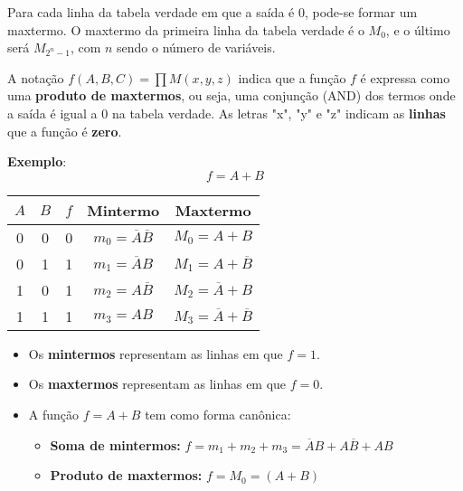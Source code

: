 \documentclass[12pt]{article}
\begin{document}
Para cada linha da tabela verdade em que a saída é 0, pode-se formar um maxtermo. O maxtermo da primeira linha da tabela verdade é o $M_0$, e o último será $M_{2^n - 1}$, com $n$ sendo o número de variáveis.

\begin{tcolorbox}[mynote, title=Notação – Forma Canônica por Maxtermos]
A notação \textit{$f(A, B, C) = \prod M(x, y, z)$} indica que a função $f$ é expressa como uma \textbf{produto de maxtermos}, ou seja, uma conjunção (AND) dos termos onde a saída é igual a 0 na tabela verdade. As letras "x", "y" e "z" indicam as \textbf{linhas} que a função é \textbf{zero}.
\end{tcolorbox} 

\vspace{0.5cm}

\textbf{Exemplo}:
\[
f = A + B
\]

\begin{center}
\begin{tabular}{|c|c|c|c|c|}
\hline
$A$  & $B$ & $f$ & Mintermo & Maxtermo \\
\hline
0 & 0 & 0 & $m_0 = \overline{A}\overline{B}$ & $M_0 = A + B$ \\
0 & 1 & 1 & $m_1 = \overline{A}B$            & $M_1 = A + \overline{B}$ \\
1 & 0 & 1 & $m_2 = A\overline{B}$            & $M_2 = \overline{A} + B$ \\
1 & 1 & 1 & $m_3 = AB$                       & $M_3 = \overline{A} + \overline{B}$ \\
\hline
\end{tabular}
\end{center}

\begin{itemize}
   \item Os \textbf{mintermos} representam as linhas em que $f = 1$.
   \item Os \textbf{maxtermos} representam as linhas em que $f = 0$.
   \item A função $f = A + B$ tem como forma canônica:
   \begin{itemize}
      \item \textbf{Soma de mintermos:} $f = m_1 + m_2 + m_3 = \overline{A}B + A\overline{B} + AB$
      \item \textbf{Produto de maxtermos:} $f = M_0 = (A + B)$
   \end{itemize}
\end{itemize}
\end{document}
